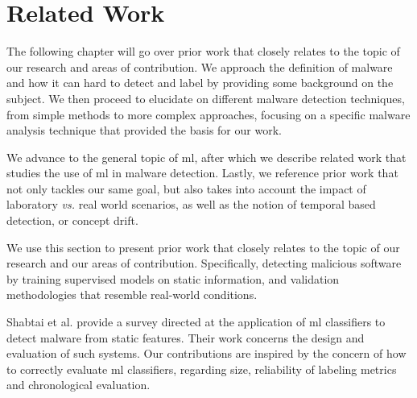 
\chapter{Related Work}
\label{chapter:related_work}

The following chapter will go over prior work that closely relates to the topic of our research and areas of contribution.
We approach the definition of malware and how it can hard to detect and label by providing some background on the subject.
We then proceed to elucidate on different malware detection techniques, from simple methods to more complex approaches, focusing on a specific malware analysis technique that provided the basis for our work.

We advance to the general topic of \gls{ml}, after which we describe related work that studies the use of \gls{ml} in malware detection.
Lastly, we reference prior work that not only tackles our same goal, but also takes into account the impact of laboratory \textit{vs.} real world scenarios, as well as the notion of temporal based detection, or concept drift.

\newpage
{}

We use this section to present prior work that closely relates to the topic of our research and our areas of contribution. Specifically, detecting malicious software by training supervised models on static information, and validation methodologies that resemble real-world conditions.

Shabtai et al.\cite{shabtai:survey} provide a survey directed
at the application of \gls{ml} classifiers to detect malware from static
features. Their work concerns the design and evaluation of such systems. Our contributions are inspired by the concern of how to correctly evaluate \gls{ml} classifiers, regarding size, reliability of labeling metrics and chronological evaluation.

